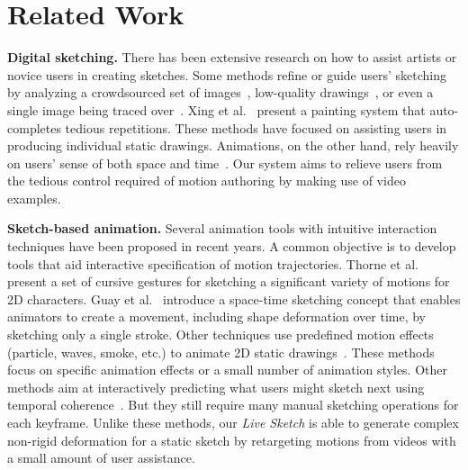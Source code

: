 \section{Related Work}


\textbf{Digital sketching.} There has been extensive research on how to assist artists or novice users in creating sketches. 
Some methods refine or guide users' sketching by analyzing a crowdsourced set of  images~\cite{Lee:2011}, low-quality drawings~\cite{Gingold:2012}, or even a single image being traced over~\cite{EZSketching:2014}. %
Xing et al.~ present a painting system that auto-completes tedious repetitions. These methods have focused on assisting users in producing individual static drawings. Animations, on the other hand, rely heavily on users' sense of both space and time~\cite{Sohn:2012,Benard:2013}. Our system aims to relieve users from the tedious control required of motion authoring by making use of video examples.


{\textbf{Sketch-based animation.} Several animation tools with intuitive interaction techniques have been proposed in recent years. A common objective 
	is to develop tools that aid interactive specification of motion 
	trajectories.  Thorne et al.~ present a set of cursive gestures for sketching a significant 
	variety of motions for 2D characters.
	Guay et al.~ introduce a space-time sketching concept that enables animators to create a movement, including shape deformation over time, by sketching only a single stroke.
	Other techniques use predefined motion effects (particle, waves, smoke, etc.) to animate 2D static 
	drawings~\cite{Kazi:2014,Xing:2016}. These methods focus on 
	specific animation effects or a small number of animation styles. 
	Other methods aim at interactively predicting what users might sketch next using temporal 
	coherence~\cite{Wang:2004,Agarwala:2004,Xing:2015}. 
	But they still require many manual sketching operations for each keyframe.
	Unlike these methods, our \textit{Live Sketch} is able to generate complex non-rigid deformation for a static sketch by retargeting motions from videos with a small amount of user assistance.
}


